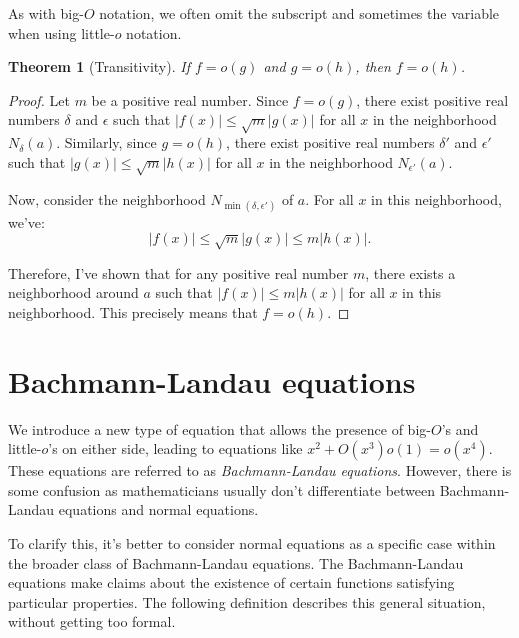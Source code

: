 \documentclass[9pt]{report}
\newtheorem{theorem}{Theorem}
\theoremstyle{definition}
\newcommand\abs[1]{\left\lvert#1\right\rvert}
\begin{document}
As with big-$O$ notation, we often omit the subscript and sometimes the variable when using little-$o$ notation.

\begin{theorem}[Transitivity]
    If \(f = o(g)\) and \(g = o(h)\), then \(f = o(h)\).
\end{theorem}

\begin{proof}
    Let \(m\) be a positive real number. Since \(f = o(g)\), there exist positive real numbers \(\delta\) and \(\epsilon\) such that \(\abs{f(x)} \leq \sqrt{m} \abs{g(x)}\) for all \(x\) in the neighborhood \(N_{\delta}(a)\). Similarly, since \(g = o(h)\), there exist positive real numbers \(\delta'\) and \(\epsilon'\) such that \(\abs{g(x)} \leq \sqrt{m} \abs{h(x)}\) for all \(x\) in the neighborhood \(N_{\epsilon'}(a)\).

    Now, consider the neighborhood \(N_{\min(\delta, \epsilon')}\) of \(a\). For all \(x\) in this neighborhood, we've:
    \[\abs{f(x)} \leq \sqrt{m} \abs{g(x)} \leq m \abs{h(x)}.\]

    Therefore, I've shown that for any positive real number \(m\), there exists a neighborhood around \(a\) such that \(\abs{f(x)} \leq m \abs{h(x)}\) for all \(x\) in this neighborhood. This precisely means that \(f = o(h)\).
\end{proof}

\section{Bachmann-Landau equations}\label{ssec:equations}

We introduce a new type of equation that allows the presence of big-$O$'s and little-$o$'s on either side, leading to equations like \(x^2 + O(x^3)o(1) = o(x^4)\). These equations are referred to as \textit{Bachmann-Landau equations}. However, there is some confusion as mathematicians usually don't differentiate between Bachmann-Landau equations and normal equations.

To clarify this, it's better to consider normal equations as a specific case within the broader class of Bachmann-Landau equations. The Bachmann-Landau equations make claims about the existence of certain functions satisfying particular properties. The following definition describes this general situation, without getting too formal.
\end{document}
